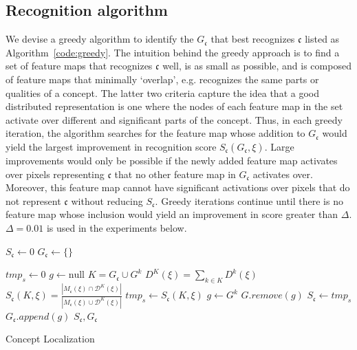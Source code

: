 \documentclass{article}
\begin{document}
\subsection{Recognition algorithm}
\label{subsub:greedy}
We devise a greedy algorithm to identify the $G_\mathfrak{c}$ that best 
recognizes $\mathfrak{c}$ listed as Algorithm~\ref{code:greedy}. 
The intuition behind the greedy 
approach is to find a set of feature maps that recognizes $\mathfrak{c}$ well, is as small
as possible, and is composed of feature maps that minimally `overlap', e.g. recognizes the same parts or qualities
of a concept. The latter two criteria capture the idea that a good 
distributed representation is one where the nodes of each feature map in the set 
activate over different and significant parts of the concept. Thus, in each greedy iteration, 
the algorithm searches for the feature map whose addition to $G_\mathfrak{c}$ would yield the largest improvement
in recognition score $S_\mathfrak{c}(G_\mathfrak{c},\xi)$. Large improvements would only be possible if the newly added
feature map activates over pixels representing $\mathfrak{c}$ that no other feature map in $G_\mathfrak{c}$
activates over. Moreover, this feature map cannot have significant activations over pixels that do not
represent $\mathfrak{c}$ without reducing $S_\mathfrak{c}$. Greedy iterations continue until there is no feature map whose inclusion would yield
an improvement in score greater than $\Delta$. $\Delta=0.01$ is used in the experiments below.

\begin{algorithm}[H]
\begin{algorithmic}[1]
\State $S_\mathfrak{c} \gets 0 $ 
\State $G_{\mathfrak{c}} \gets \{\}$ 

  \State $tmp_s \gets 0$
  \State $g \gets \text{null}$
      \State $K = G_\mathfrak{c} \cup G^k$ 
        \State $D^{K}(\xi) = \sum_{k \in K} D^k(\xi)$ 
        \State $S_\mathfrak{c}(K,\xi) = \frac{| M_\mathfrak{c}(\xi) \cap \mathcal{D}^{K}(\xi) |}{| M_\mathfrak{c}(\xi) \cup \mathcal{D}^{K}(\xi) |}$ 
      
          \State $tmp_s \gets S_\mathfrak{c}(K,\xi)$ 
            \State $g \gets G^k$ 
        \EndIf
    \EndFor
    \State $G.remove(g)$  
     
      \State $S_\mathfrak{c} \gets tmp_s$
        \State $G_{\mathfrak{c}}.append(g)$ 
    \Else
      \State \Return $S_\mathfrak{c}, G_\mathfrak{c}$
    \EndIf
\EndWhile
\EndProcedure
\end{algorithmic}
\caption{Concept Localization}\label{code:greedy}
\end{algorithm}
\end{document}
